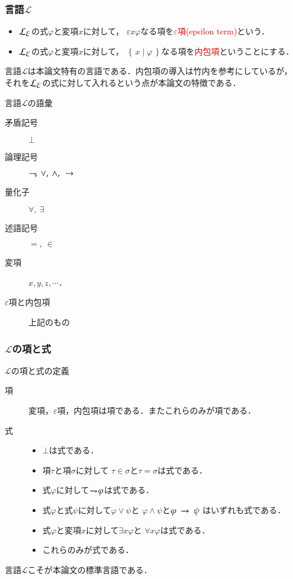 \documentclass[dvipdfmx,10pt,notheorems]{beamer}
\theoremstyle{definition}
\newcommand{\lang}[1]{\mathcal{L}_{\scalebox{1.2}{$#1$}}} %
\newcommand{\Set}[2]{\left\{\, #1 \mid #2\, \right\}} %
\newcommand{\negation}{\rightharpoondown\hspace{-0.25em}} %
\newcommand{\rarrow}{\hspace{0.25em}\rightarrow\hspace{0.25em}} %
\begin{document}
\begin{frame}\frametitle{言語$\mathcal{L}$}
	\begin{itemize}
		\item $\lang{\varepsilon}$の式$\varphi$と変項$x$に対して，
			$\varepsilon x \varphi$なる項を\textcolor{red}{$\varepsilon$項(epsilon term)}という．
			
		\item $\lang{\varepsilon}$の式$\varphi$と変項$x$に対して，
			$\Set{x}{\varphi}$なる項を\textcolor{red}{内包項}ということにする．
	\end{itemize}
	
	言語$\mathcal{L}$は本論文特有の言語である．内包項の導入は竹内\cite{TakeuchiSet}を参考にしているが，
	それを$\lang{\varepsilon}$の式に対して入れるという点が本論文の特徴である．
	
	\begin{exampleblock}{言語$\mathcal{L}$の語彙}
		\begin{description}
			\item[矛盾記号] $\bot$
			\item[論理記号] $\negation,\ \vee,\ \wedge,\ \rarrow$
			\item[量化子] $\forall,\ \exists$
			\item[述語記号] $=,\ \in$
			\item[変項] $x,y,z,\cdots$．
			\item[$\varepsilon$項と内包項] 上記のもの 
		\end{description}
	\end{exampleblock}
\end{frame}

\begin{frame}\frametitle{$\mathcal{L}$の項と式}

	\begin{exampleblock}{$\mathcal{L}$の項と式の定義}
		\begin{description}
			\item[項] 変項，$\varepsilon$項，内包項は項である．またこれらのみが項である．
			
			\item[式] 
				\begin{itemize}
					\item $\bot$は式である．
					\item 項$\tau$と項$\sigma$に対して
						$\tau \in \sigma$と$\tau = \sigma$は式である．
					\item 式$\varphi$に対して$\negation \varphi$は式である．
					\item 式$\varphi$と式$\psi$に対して$\varphi \vee \psi$と
						$\varphi \wedge \psi$と$\varphi \rarrow \psi$
						はいずれも式である．
					\item 式$\varphi$と変項$x$に対して$\exists x \varphi$と
						$\forall x \varphi$は式である．
					\item これらのみが式である．
				\end{itemize}
		\end{description}
	\end{exampleblock}
	
	言語$\mathcal{L}$こそが本論文の標準言語である．
	
\end{frame}
\end{document}
